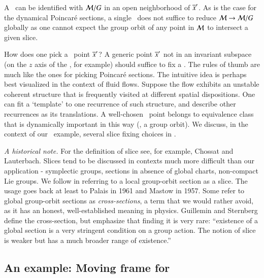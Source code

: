 \documentclass[final,number,sort&compress]{elsarticle}
\begin{document}
A \slice\ can be identified with ${\cal M}/G$ in an open
neighborhood of ${\overline{x}'}$. As is the case for the dynamical
Poincar\'e sections, a single \slice\ does not
suffice to reduce ${\cal M} \to {\cal M}/G$ globally as
 one cannot expect the group orbit
of any point in ${\cal M}$ to intersect a given slice.

How does one pick a \slice\ point ${\overline{x}'}$? A generic point
${\overline{x}'} $ not in an in\-vari\-ant subspace (on the $z$
axis of the \cLe, for example) should suffice to fix a \slice.
The rules of thumb are much like the ones for picking
Poincar\'e sections. The intuitive
idea is perhaps best visualized in the context of fluid
flows. Suppose the flow exhibits an unstable coherent
structure that {is frequently visited at}
different spatial dispositions. One can fit a `template' to one
recurrence of such structure, and describe other recurrences
as its translations. A well-chosen \slice\ point belongs to
{equivalence class that is dynamically important in
this way} (\ie, a group orbit).
We discuss, in the context of our \cLe\ example, several slice fixing
choices in .

\emph{A historical note.}
For the definition of slice see, for example,  Chossat and
Lauterbach. Slices tend to be discussed in
contexts much more difficult than our application -
symplectic groups, sections in absence of global charts,
non-compact Lie groups. We follow
 in referring to a local
group-orbit section as a slice. The usage goes back at least
to Palais in 1961 and Mastow in 1957.
Some refer to global group-orbit
sections as \emph{cross-sections}, a term that we would rather
avoid, as it has an honest, well-established meaning in
physics.
Guillemin and Sternberg define the
cross-section, but emphasize that finding it is very
rare: ``existence of a global section is a very stringent
condition on a group action. The notion of slice is weaker
but has a much broader range of existence.''


\subsection{\label{sec:CLeMovFr}An example: Moving frame for \cLe}
\end{document}
